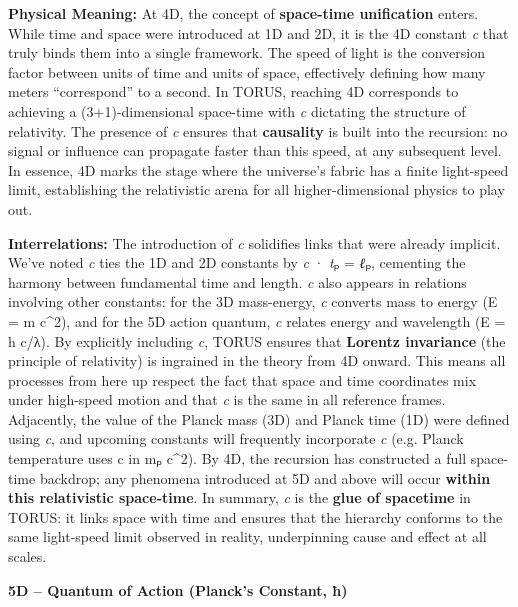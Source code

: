 \documentclass[
]{article}
\begin{document}
\textbf{Physical Meaning:} At 4D, the concept of \textbf{space-time
unification} enters. While time and space were introduced at 1D and 2D,
it is the 4D constant \emph{c} that truly binds them into a single
framework. The speed of light is the conversion factor between units of
time and units of space\hspace{0pt}, effectively defining how many
meters ``correspond'' to a second. In TORUS, reaching 4D corresponds to
achieving a (3+1)-dimensional space-time with \emph{c} dictating the
structure of relativity. The presence of \emph{c} ensures that
\textbf{causality} is built into the recursion: no signal or influence
can propagate faster than this speed, at any subsequent
level\hspace{0pt}. In essence, 4D marks the stage where the universe's
fabric has a finite light-speed limit, establishing the relativistic
arena for all higher-dimensional physics to play out.

\textbf{Interrelations:} The introduction of \emph{c} solidifies links
that were already implicit. We've noted \emph{c} ties the 1D and 2D
constants by \emph{c} · \emph{t}ₚ = \emph{ℓ}ₚ\hspace{0pt}, cementing the
harmony between fundamental time and length. \emph{c} also appears in
relations involving other constants: for the 3D mass-energy, \emph{c}
converts mass to energy (E = m c\^{}2), and for the 5D action quantum,
\emph{c} relates energy and wavelength (E = h c/λ)\hspace{0pt}. By
explicitly including \emph{c}, TORUS ensures that \textbf{Lorentz
invariance} (the principle of relativity) is ingrained in the theory
from 4D onward. This means all processes from here up respect the fact
that space and time coordinates mix under high-speed motion and that
\emph{c} is the same in all reference frames. Adjacently, the value of
the Planck mass (3D) and Planck time (1D) were defined using \emph{c},
and upcoming constants will frequently incorporate \emph{c} (e.g. Planck
temperature uses c in mₚ c\^{}2). By 4D, the recursion has constructed a
full space-time backdrop; any phenomena introduced at 5D and above will
occur \textbf{within this relativistic space-time}\hspace{0pt}. In
summary, \emph{c} is the \textbf{glue of spacetime} in TORUS: it links
space with time and ensures that the hierarchy conforms to the same
light-speed limit observed in reality, underpinning cause and effect at
all scales.

\textbf{5D -- Quantum of Action (Planck's Constant, ħ)}
\end{document}
